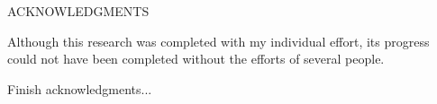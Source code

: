 
\setcounter{page}{3} %

\begin{center}
	ACKNOWLEDGMENTS
\end{center}

\indent Although this research was completed with my individual effort, its progress could not have been completed without the efforts of several people.

\indent Finish acknowledgments...
